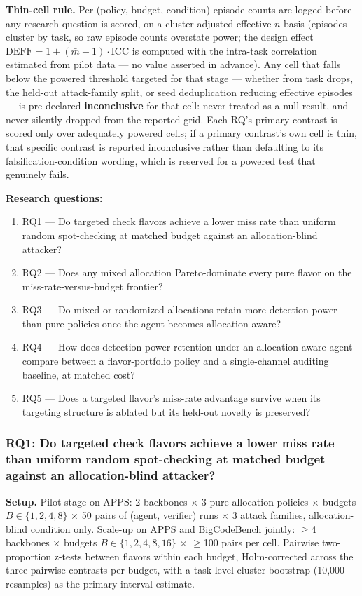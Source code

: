 \documentclass[11pt]{article}
\begin{document}
\textbf{Thin-cell rule.} Per-(policy, budget, condition) episode counts are logged before any research question is scored, on a cluster-adjusted effective-$n$ basis (episodes cluster by task, so raw episode counts overstate power; the design effect $\mathrm{DEFF} = 1 + (\bar m - 1)\cdot\mathrm{ICC}$ is computed with the intra-task correlation estimated from pilot data --- no value asserted in advance). Any cell that falls below the powered threshold targeted for that stage --- whether from task drops, the held-out attack-family split, or seed deduplication reducing effective episodes --- is pre-declared \textbf{inconclusive} for that cell: never treated as a null result, and never silently dropped from the reported grid. Each RQ's primary contrast is scored only over adequately powered cells; if a primary contrast's own cell is thin, that specific contrast is reported inconclusive rather than defaulting to its falsification-condition wording, which is reserved for a powered test that genuinely fails.

\textbf{Research questions:}
\begin{enumerate}[leftmargin=1.6em]
\item RQ1 --- Do targeted check flavors achieve a lower miss rate than uniform random spot-checking at matched budget against an allocation-blind attacker?
\item RQ2 --- Does any mixed allocation Pareto-dominate every pure flavor on the miss-rate-versus-budget frontier?
\item RQ3 --- Do mixed or randomized allocations retain more detection power than pure policies once the agent becomes allocation-aware?
\item RQ4 --- How does detection-power retention under an allocation-aware agent compare between a flavor-portfolio policy and a single-channel auditing baseline, at matched cost?
\item RQ5 --- Does a targeted flavor's miss-rate advantage survive when its targeting structure is ablated but its held-out novelty is preserved?
\end{enumerate}

\subsubsection{RQ1: Do targeted check flavors achieve a lower miss rate than uniform random spot-checking at matched budget against an allocation-blind attacker?}
\textbf{Setup.} Pilot stage on APPS: 2 backbones $\times$ 3 pure allocation policies $\times$ budgets $B \in \{1,2,4,8\}$ $\times$ 50 pairs of (agent, verifier) runs $\times$ 3 attack families, allocation-blind condition only. Scale-up on APPS and BigCodeBench jointly: $\geq$4 backbones $\times$ budgets $B \in \{1,2,4,8,16\}$ $\times$ $\geq$100 pairs per cell. Pairwise two-proportion z-tests between flavors within each budget, Holm-corrected across the three pairwise contrasts per budget, with a task-level cluster bootstrap (10,000 resamples) as the primary interval estimate.
\end{document}
